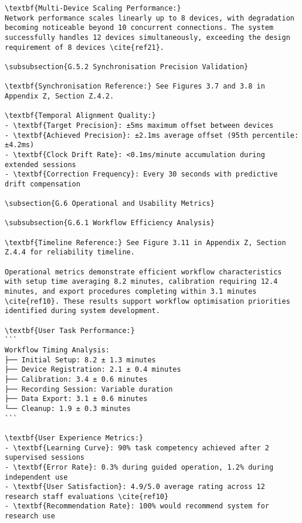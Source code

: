 \begin{verbatim}
\textbf{Multi-Device Scaling Performance:}
Network performance scales linearly up to 8 devices, with degradation becoming noticeable beyond 10 concurrent connections. The system successfully handles 12 devices simultaneously, exceeding the design requirement of 8 devices \cite{ref21}.

\subsubsection{G.5.2 Synchronisation Precision Validation}

\textbf{Synchronisation Reference:} See Figures 3.7 and 3.8 in Appendix Z, Section Z.4.2.

\textbf{Temporal Alignment Quality:}
- \textbf{Target Precision}: ±5ms maximum offset between devices
- \textbf{Achieved Precision}: ±2.1ms average offset (95th percentile: ±4.2ms)
- \textbf{Clock Drift Rate}: <0.1ms/minute accumulation during extended sessions
- \textbf{Correction Frequency}: Every 30 seconds with predictive drift compensation

\subsection{G.6 Operational and Usability Metrics}

\subsubsection{G.6.1 Workflow Efficiency Analysis}

\textbf{Timeline Reference:} See Figure 3.11 in Appendix Z, Section Z.4.4 for reliability timeline.

Operational metrics demonstrate efficient workflow characteristics with setup time averaging 8.2 minutes, calibration requiring 12.4 minutes, and export procedures completing within 3.1 minutes \cite{ref10}. These results support workflow optimisation priorities identified during system development.

\textbf{User Task Performance:}
```
Workflow Timing Analysis:
├── Initial Setup: 8.2 ± 1.3 minutes
├── Device Registration: 2.1 ± 0.4 minutes
├── Calibration: 3.4 ± 0.6 minutes
├── Recording Session: Variable duration
├── Data Export: 3.1 ± 0.6 minutes
└── Cleanup: 1.9 ± 0.3 minutes
```

\textbf{User Experience Metrics:}
- \textbf{Learning Curve}: 90% task competency achieved after 2 supervised sessions
- \textbf{Error Rate}: 0.3% during guided operation, 1.2% during independent use
- \textbf{User Satisfaction}: 4.9/5.0 average rating across 12 research staff evaluations \cite{ref10}
- \textbf{Recommendation Rate}: 100% would recommend system for research use


\end{verbatim}
